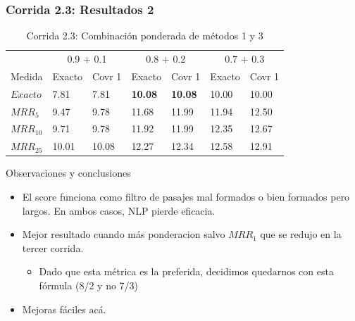 \begin{frame}
\frametitle{Corrida 2.3: Resultados 2}

\begin{table}
\centering
\begin{center}
\begin{tabular}{|l | l | l | l | l | l | l |}

& \multicolumn{2}{|c|}{0.9 + 0.1} &
  \multicolumn{2}{|c|}{0.8 + 0.2} &
  \multicolumn{2}{|c|}{0.7 + 0.3} \\ 
Medida & Exacto & Covr 1 & Exacto & Covr 1 & Exacto & Covr 1 \\ 
$Exacto$ & 7.81 & 7.81 & \textbf{10.08} & \textbf{10.08} & 10.00 & 10.00  \\ 
$MRR_{5}$ & 9.47 & 9.78 & 11.68 & 11.99 & 11.94 & 12.50  \\ 
$MRR_{10}$ & 9.71 & 9.78 & 11.92 & 11.99 & 12.35 & 12.67  \\ 
$MRR_{25}$ & 10.01 & 10.08 & 12.27 & 12.34 & 12.58 & 12.91  \\ 
\end{tabular}
\caption{Corrida 2.3: Combinación ponderada de métodos 1 y 3}
\end{center}
\end{table}


Observaciones y conclusiones
\begin{itemize}
  \item El score funciona como filtro de pasajes mal formados o bien formados pero largos. En ambos casos, NLP pierde eficacia.
  \item Mejor resultado cuando más ponderacion salvo $MRR_1$ que se redujo en la tercer corrida. 
  \begin{itemize}
    \item Dado que esta métrica es la preferida, decidimos quedarnos con esta fórmula (8/2 y no 7/3)
    \end{itemize}
  \item Mejoras fáciles acá.
  \end{itemize}

\end{frame}




